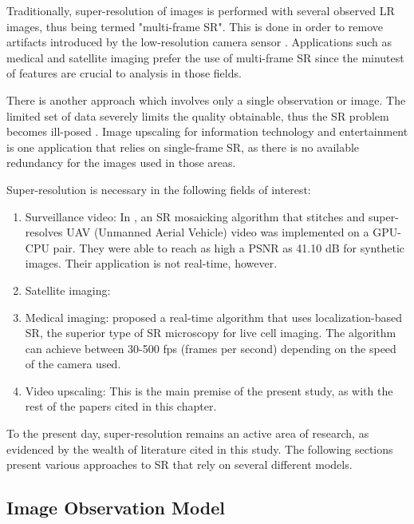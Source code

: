 Traditionally, super-resolution of images is performed with several observed LR images, thus being termed "multi-frame SR". 
This is done in order to remove artifacts introduced by the low-resolution camera sensor \citep{Yang2010a}. 
Applications such as medical and satellite imaging prefer the use of multi-frame SR since the minutest of features are crucial to analysis in those fields.

There is another approach which involves only a single observation or image.
The limited set of data severely limits the quality obtainable, thus 
the SR problem becomes ill-posed \citep{Yang2010a}.
Image upscaling for information technology and entertainment is one application that relies on single-frame SR, as there is no available redundancy for the images used in those areas.

Super-resolution is necessary in the following fields of interest:
\begin{enumerate}
	\item Surveillance video: In \cite{Camargo2010}, an SR mosaicking algorithm that stitches and super-resolves UAV (Unmanned Aerial Vehicle) video was implemented on a GPU-CPU pair. They were able to reach as high a PSNR as 41.10 dB for synthetic images. Their application is not real-time, however.
	\item Satellite imaging: 
	\item Medical imaging: 
	\cite{Quan2010} proposed a real-time algorithm that uses localization-based SR, the superior type of SR microscopy for live cell imaging. The algorithm can achieve between 30-500 fps (frames per second) depending on the speed of the camera used.
	\item Video upscaling: This is the main premise of the present study, as with the rest of the papers cited in this chapter.
\end{enumerate}

To the present day, super-resolution remains an active area of research, as evidenced by the wealth of literature cited in this study. 
The following sections present various approaches to SR that rely on several different models.

\subsection{Image Observation Model}


